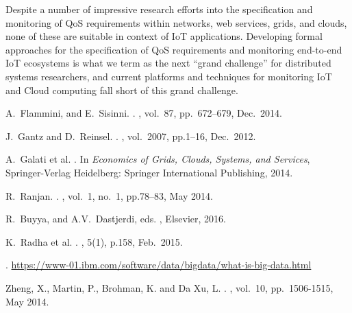 Despite a number of impressive research efforts into the specification and monitoring of QoS requirements within networks, web services, grids, and clouds, none of these are suitable in context of IoT applications.
Developing formal approaches for the specification of QoS requirements and monitoring end-to-end IoT ecosystems is what we term as the next ``grand challenge'' for distributed systems researchers,
and current platforms and techniques for monitoring IoT and Cloud computing fall short of this grand challenge.


\begin{thebibliography}{10}

A.~Flammini, and E.~Sisinni.
.
, vol.~87, pp.~672--679, Dec.~2014.

J.~Gantz and D.~Reinsel.
.
, vol.~2007, pp.1--16, Dec.~2012.

A.~Galati et al.
.
\newblock In {\em Economics of Grids, Clouds, Systems, and Services}, Springer-Verlag Heidelberg: Springer International Publishing, 2014. 

R.~Ranjan.
.
, vol.~1, no.~1, pp.78--83, May 2014.

R.~Buyya, and A.V.~Dastjerdi, eds.
, Elsevier, 2016.

K.~Radha et al.
.
, 5(1), p.158, Feb.~2015. 

.
\newblock \url{https://www-01.ibm.com/software/data/bigdata/what-is-big-data.html}

Zheng, X., Martin, P., Brohman, K. and Da Xu, L.
.
, vol.~10, pp.~1506-1515, May 2014.


\end{thebibliography}
